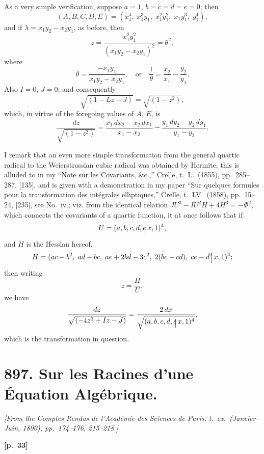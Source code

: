 \documentclass[11pt,a4paper]{book}
\begin{document}
As a very simple verification, suppose $a = 1$, $b = c = d = e = 0$; then
$$
(A, B, C, D, E) = (x_1^4,\; x_1^3 y_1,\; x_1^2 y_1^2,\; x_1 y_1^3,\; y_1^4),
$$
and if $\lambda = x_1 y_2 - x_2 y_1$, as before, then
$$
z = \frac{x_1^2 y_1^2}{(x_1 y_2 - x_2 y_1)^2} = \theta^2,
$$
where
$$
\theta = \frac{-x_1 y_1}{x_1 y_2 - x_2 y_1}, \quad \text{or} \quad \frac{1}{\theta} = \frac{x_2}{x_1} - \frac{y_2}{y_1}.
$$
Also $I = 0$, $J = 0$, and consequently
$$
\sqrt{(1 - Lz - J)} = \sqrt{(1 - z^2)},
$$
which, in virtue of the foregoing values of $A$, $E$, is
$$
\frac{dz}{\sqrt{(1 - z^2)}} = \frac{x_1\,dx_2 - x_2\,dx_1}{x_1 - x_2} - \frac{y_1\,dy_2 - y_2\,dy_1}{y_1 - y_2}.
$$

I remark that an even more simple transformation from the general quartic radical to the Weierstrassian cubic radical was obtained by Hermite; this is alluded to in my ``Note sur les Covariants, \&c.,'' Crelle, t.\ L.\ (1855), pp.\ 285--287, [135], and is given with a demonstration in my paper ``Sur quelques formules pour la transformation des int\'egrales elliptiques,'' Crelle, t.\ LV.\ (1858), pp.\ 15--24, [235], see No.\ iv.; viz. from the identical relation $JU^3 - IU^2H + 4H^3 = -\Phi^2$, which connects the covariants of a quartic function, it at once follows that if
$$
U = (a, b, c, d, e \!\!\raisebox{-2pt}{$\bigm|$}\, x, 1)^4,
$$
and $H$ is the Hessian hereof,
$$
H = (ac - b^2,\; ad - bc,\; ae + 2bd - 3c^2,\; 2(be - cd),\; ce - d^2 \!\!\raisebox{-2pt}{$\bigm|$}\, x, 1)^4;
$$
then writing
$$
z = \frac{H}{U},
$$
we have
$$
\frac{dz}{\sqrt{(-4z^3 + Iz - J)}} = \frac{2\,dx}{\sqrt{(a, b, c, d, e \!\!\raisebox{-2pt}{$\bigm|$}\, x, 1)^4}},
$$
which is the transformation in question.

\newpage

\section*{897. Sur les Racines d'une \'Equation Alg\'ebrique.}

\noindent\textit{[From the Comptes Rendus de l'Acad\'emie des Sciences de Paris, t.\ cx.\ (Janvier--Juin, 1890), pp.\ 174--176, 215--218.]}

\vspace{0.5em}
\noindent\textbf{[p.\ 33]}
\end{document}
